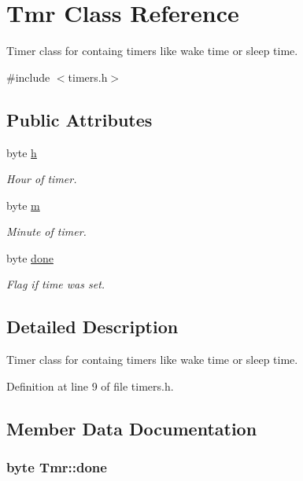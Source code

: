 \hypertarget{struct_tmr}{\section{Tmr Class Reference}
\label{struct_tmr}
}


Timer class for containg timers like wake time or sleep time.  




{\ttfamily \#include $<$timers.\+h$>$}

\subsection*{Public Attributes}
\begin{DoxyCompactItemize}
\item 
byte \hyperlink{struct_tmr_ab0374a7fbe830064a06fb13512453ffa}{h}
\begin{DoxyCompactList}\small\item\em Hour of timer. \end{DoxyCompactList}\item 
byte \hyperlink{struct_tmr_a554c428f359f6d17e82324b0c7568f1a}{m}
\begin{DoxyCompactList}\small\item\em Minute of timer. \end{DoxyCompactList}\item 
byte \hyperlink{struct_tmr_a66e7dcd2c90cb3c25d6410dd1039a2b2}{done}
\begin{DoxyCompactList}\small\item\em Flag if time was set. \end{DoxyCompactList}\end{DoxyCompactItemize}


\subsection{Detailed Description}
Timer class for containg timers like wake time or sleep time. 

Definition at line 9 of file timers.\+h.



\subsection{Member Data Documentation}
\hypertarget{struct_tmr_a66e7dcd2c90cb3c25d6410dd1039a2b2}{
\subsubsection[{done}]{\setlength{\rightskip}{0pt plus 5cm}byte Tmr\+::done}}\label{struct_tmr_a66e7dcd2c90cb3c25d6410dd1039a2b2}


